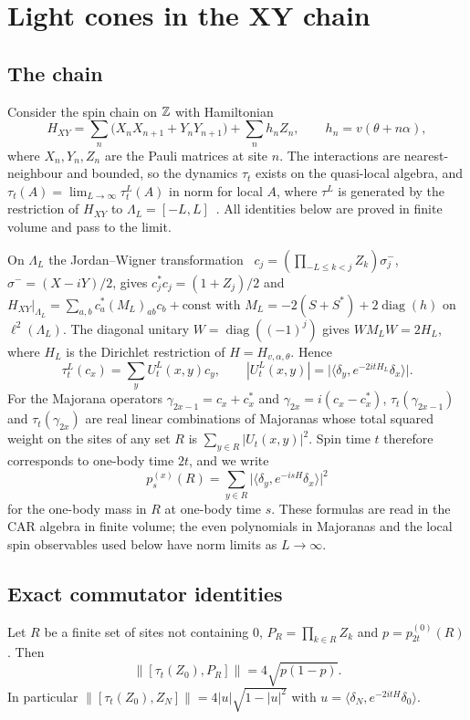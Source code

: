 \section{Light cones in the XY chain}\label{sec:xy}

\subsection{The chain}

Consider the spin chain on $\mathbb Z$ with Hamiltonian
\[
H_{XY}=\sum_n\bigl(X_nX_{n+1}+Y_nY_{n+1}\bigr)+\sum_nh_nZ_n,\qquad h_n=v(\theta+n\alpha),
\]
where $X_n,Y_n,Z_n$ are the Pauli matrices at site $n$. The interactions are nearest-neighbour and bounded, so the dynamics $\tau_t$ exists on the quasi-local algebra, and $\tau_t(A)=\lim_{L\to\infty}\tau^L_t(A)$ in norm for local $A$, where $\tau^L$ is generated by the restriction of $H_{XY}$ to $\Lambda_L=[-L,L]$~\cite{LiebRobinson1972}. All identities below are proved in finite volume and pass to the limit.

On $\Lambda_L$ the Jordan--Wigner transformation~\cite{LSM1961} $c_j=(\prod_{-L\le k<j}Z_k)\sigma^-_j$, $\sigma^-=(X-iY)/2$, gives $c_j^*c_j=(1+Z_j)/2$ and $H_{XY}|_{\Lambda_L}=\sum_{a,b}c_a^*(M_L)_{ab}c_b+\mathrm{const}$ with $M_L=-2(S+S^*)+2\operatorname{diag}(h)$ on $\ell^2(\Lambda_L)$. The diagonal unitary $W=\operatorname{diag}((-1)^j)$ gives $WM_LW=2H_L$, where $H_L$ is the Dirichlet restriction of $H=H_{v,\alpha,\theta}$. Hence
\[
\tau^L_t(c_x)=\sum_yU^L_t(x,y)c_y,\qquad|U^L_t(x,y)|=\bigl|\langle\delta_y,e^{-2itH_L}\delta_x\rangle\bigr| .
\]
For the Majorana operators $\gamma_{2x-1}=c_x+c_x^*$ and $\gamma_{2x}=i(c_x-c_x^*)$, $\tau_t(\gamma_{2x-1})$ and $\tau_t(\gamma_{2x})$ are real linear combinations of Majoranas whose total squared weight on the sites of any set $R$ is $\sum_{y\in R}|U_t(x,y)|^2$. Spin time $t$ therefore corresponds to one-body time $2t$, and we write
\[
p^{(x)}_s(R)=\sum_{y\in R}\bigl|\langle\delta_y,e^{-isH}\delta_x\rangle\bigr|^2
\]
for the one-body mass in $R$ at one-body time $s$. These formulas are read in the CAR algebra in finite volume; the even polynomials in Majoranas and the local spin observables used below have norm limits as $L\to\infty$.

\subsection{Exact commutator identities}

\begin{proposition}\label{prop:comm}
Let $R$ be a finite set of sites not containing $0$, $P_R=\prod_{k\in R}Z_k$ and $p=p^{(0)}_{2t}(R)$. Then
\[
\bigl\|[\tau_t(Z_0),P_R]\bigr\|=4\sqrt{p(1-p)} .
\]
In particular $\|[\tau_t(Z_0),Z_N]\|=4|u|\sqrt{1-|u|^2}$ with $u=\langle\delta_N,e^{-2itH}\delta_0\rangle$.
\end{proposition}

